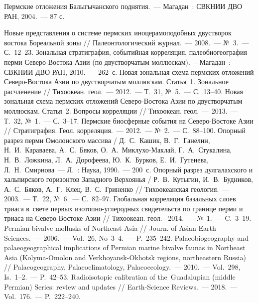 \begin{thebibliography}{99}
\bibitem{} Пермские отложения Балыгычанского поднятия.~--- Магадан~: СВКНИИ ДВО РАН, 2004.~--- 87 с.

\bibitem{} Новые представления о системе пермских иноцерамоподобных двустворок востока Бореальной зоны // Палеонтологический журнал.~--- 2008.~---  №~3.~--- С.~12--23.
\bibitem{} Зональная стратиграфия, событийная корреляция, палеобиогеография перми Северо-Востока Азии (по двустворчатым моллюскам).~-- Магадан~: СВКНИИ ДВО РАН, 2010.~--- 262~с.
\bibitem{} Новая зональная схема пермских отложений Северо-Востока Азии по двустворчатым моллюскам. Статья~1. Зональное расчленение // Тихоокеан. геол.~---  2012.~--- Т.~31, №~5.~--- С.~13--40.
\bibitem{} Новая зональная схема пермских отложений Северо-Востока Азии по двустворчатым моллюскам. Статья~2. Вопросы корреляции // Тихоокеан. геол.~---  2013.~---  Т.~32, №~1.~--- С.~3--17.
\bibitem{} Пермские биосферные события на Северо-Востоке Азии // Стратиграфия. Геол. корреляция.~---  2012.~---  №~2.~---  С.~88--100.
\bibitem{} Опорный разрез перми Омолонского массива / Д.~С.~Кашик, В.~Г.~Ганелин, Н.~И.~Караваева, А.~С.~Бяков, О.~А.~Миклухо-Маклай, Г.~А.~Стукалина, Н.~В.~Ложкина, Л.~А.~Дорофеева, Ю.~К.~Бурков, Е.~И.~Гутенева, Л.~Н.~Смирнова~--- Л.~: Наука, 1990.~---  200~с.
\bibitem{} Опорный разрез дулгалахского и хальпирского горизонтов Западного Верхоянья / Р.~В.~Кутыгин, И.~В.~Будников, А.~С.~Бяков, А.~Г.~Клец, В.~С.~Гриненко // Тихоокеанская геология.~---  2003.~---  Т.~22, №~6.~---  С.~82--97.
\bibitem{} Глобальная корреляция базальных слоев триаса в~свете первых изотопно-углеродных свидетельств по границе перми и триаса на Северо-Востоке Азии // Тихоокеан. геол.­--  2014.~---  №~1.~---  C.~3--19.
\bibitem{} Permian bivalve mollusks of Northeast Asia // Journ. of Asian Earth Sciences.~--- 2006.~--- Vol.~26, No~3--4.~--- P.~235--242.
\bibitem{} Palaeobiogeography and palaeogeographical implications of Permian marine bivalve faunas in Northeast Asia (Kolyma-Omolon and Verkhoyansk-Okhotsk regions, northeastern Russia) // Palaeogeography, Palaeoclimatology, Palaeoecology.~--- 2010.~--- Vol.~298, Is.~1--2.~--- P.~42--53.
\bibitem{} Radioisotopic calibration of the~Guadalupian (middle Permian) Series: review and updates // Earth-Science Reviews.~--- 2018.~--- Vol.~176.~--- P.~222--240.

\end{thebibliography}
